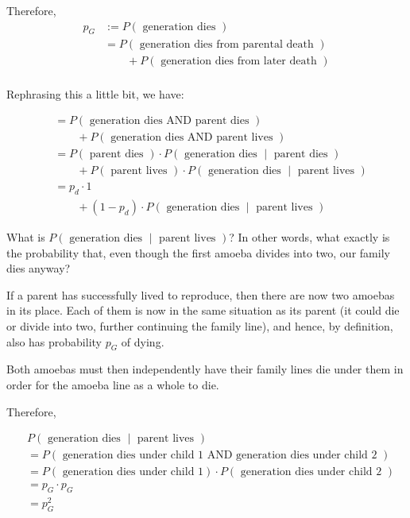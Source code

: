 Therefore, 
\begin{align*}
p_G &:= P(\text{ generation dies }) \\
&= P(\text{ generation dies from parental death }) \\
&\qquad + P(\text{ generation dies from later death }) \\ %
\end{align*}

Rephrasing this a little bit, we have:

\begin{align*}
&= P(\text{ generation dies AND parent dies }) \\
&\qquad + P(\text{ generation dies AND parent lives }) \\
&= P(\text{ parent dies }) \cdot P\left(\text{ generation dies } \middle| \text{ parent dies }\right) \\
&\qquad + P(\text{ parent lives }) \cdot P\left(\text{ generation dies } \middle| \text{ parent lives }\right) \\
&= p_d \cdot 1 \\
&\qquad + (1 - p_d) \cdot P\left(\text{ generation dies } \middle| \text{ parent lives }\right)
\end{align*}

What is $P\left(\text{ generation dies } \middle| \text{ parent lives }\right)$? In other words, what exactly is the probability that, even though the first amoeba divides into two, our family dies anyway?

If a parent has successfully lived to reproduce, then there are now two amoebas in its place. Each of them is now in the same situation as its parent (it could die or divide into two, further continuing the family line), and hence, by definition, also has probability $p_G$ of dying. 

Both amoebas must then independently have their family lines die under them in order for the amoeba line as a whole to die.

Therefore, 

\begin{align*}
&P\left(\text{ generation dies } \middle| \text{ parent lives }\right) \\
&= P\left(\text{ generation dies under child 1 AND generation dies under child 2 } \right) \\
&= P\left(\text{ generation dies under child 1} \right) \cdot P\left(\text{ generation dies under child 2 } \right) \\
&= p_G \cdot p_G \\
&= p_G^2
\end{align*}

